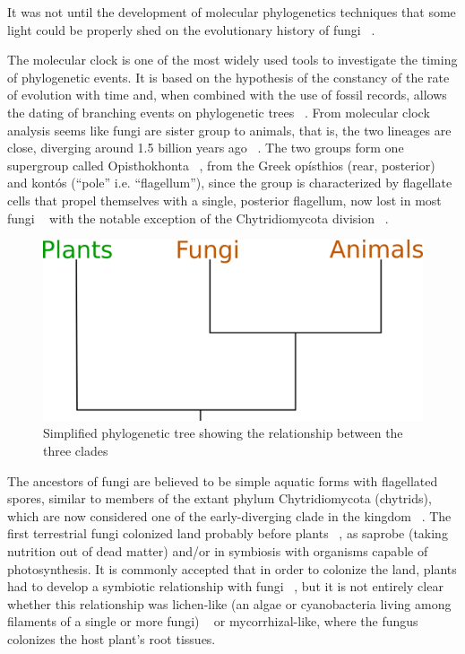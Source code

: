 It was not until the development of molecular phylogenetics techniques that some light could be properly shed on the evolutionary history of fungi ~\citep{james2006}.

The molecular clock is one of the most widely used tools to investigate the timing of phylogenetic events. It is based on the hypothesis of the constancy of the rate of evolution with time and, when combined with the use of fossil records, allows the dating of branching events on phylogenetic trees ~\citep{lepage2007, weir2008}.
From molecular clock analysis seems like fungi are sister group to animals, that is, the two lineages are close, diverging around 1.5 billion years ago ~\citep{wang1999}. The two groups form one supergroup called Opisthokhonta ~\citep{cavalier-smith1987}, from the Greek opísthios (rear, posterior) and kontós (``pole'' i.e. ``flagellum''), since the group is characterized by flagellate cells that propel themselves with a single, posterior flagellum, now lost in most fungi ~\citep{steenkamp2006} with the notable exception of the Chytridiomycota division ~\citep{james2006a}.

\begin{figure}[htbp]
\centering
\includegraphics[keepaspectratio,width=\textwidth,height=0.75\textheight]{images/pfatree.png}
\caption{Simplified phylogenetic tree showing the relationship between the three clades}
\end{figure}

The ancestors of fungi are believed to be simple aquatic forms with flagellated spores, similar to members of the extant phylum Chytridiomycota (chytrids), which are now considered one of the early-diverging clade in the kingdom ~\citep{james2006}. The first terrestrial fungi colonized land probably before plants ~\citep{heckman2001}, as saprobe (taking nutrition out of dead matter) and\slash or in symbiosis with organisms capable of photosynthesis.
It is commonly accepted that in order to colonize the land, plants had to develop a symbiotic relationship with fungi ~\citep{selosse1998, heckman2001, bonneville2020}, but it is not entirely clear whether this relationship was lichen-like (an algae or cyanobacteria living among filaments of a single or more fungi) ~\citep{spribille2016} or mycorrhizal-like, where the fungus colonizes the host plant's root tissues.


